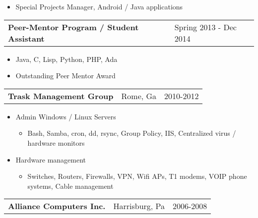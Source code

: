 \documentclass{book}
\newenvironment{myitemize}
{ \begin{itemize}
	\setlength{\itemsep}{0pt}
	\setlength{\parskip}{0pt}
	\setlength{\parsep}{0pt}     }
{ \end{itemize}                  }
\begin{document}
	\begin{myitemize}
		\item Special Projects Manager, Android / Java applications 
	\end{myitemize}

\begin{tabular}{L{4.75in}R{1.75in}}

	{\large {\bfseries Peer-Mentor Program / Student Assistant}} & Spring 2013 - Dec 2014 \\

\end{tabular}

	\begin{myitemize}
		\item Java, C, Lisp, Python, PHP, Ada
		\item Outstanding Peer Mentor Award 
	\end{myitemize} 


\begin{tabular}{L{3in}L{1.75in}R{1.75in}}

	 {\large {\bfseries Trask Management Group}} & Rome, Ga & 2010-2012 \\

\end{tabular}

\begin{myitemize}
	
	\item Admin Windows / Linux Servers

	\begin{myitemize}

		\item Bash, Samba, cron, dd, rsync, Group Policy, IIS, Centralized virus / hardware monitors

	\end{myitemize}
		
	\item Hardware management

	\begin{myitemize}

		\item Switches, Routers, Firewalls, VPN, Wifi APs, T1 modems, VOIP phone systems, Cable management

	\end{myitemize}

\end{myitemize}

\begin{tabular}{L{3in}L{1.75in}R{1.75in}}

	 {\large {\bfseries Alliance Computers Inc.}} & Harrisburg, Pa & 2006-2008 \\

\end{tabular}
\end{document}
